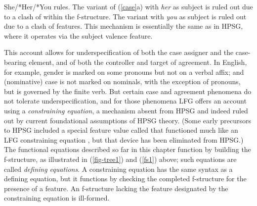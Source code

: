 \eal 
 \label{case}
\ex She/*Her/*You rules.
 \zl
The variant of (\ref{case}a) with \textit{her} as subject is ruled out due to a clash of   within the \subj{}  f-structure.  The variant with \textit{you} as subject is ruled out due to a clash of  features.  This mechanism is essentially the same as in HPSG, where it operates via the subject valence feature.  

This account allows for underspecification of both the case assigner and the case-bearing element, and of both the controller and target of agreement.   In  English, for example, gender is marked on some pronouns but not on a verbal affix; and (nominative) case is not marked on   nominals, with the exception of  pronouns, but is governed by the finite verb.  But certain case and agreement phenomena do not tolerate underspecification, and for those phenomena LFG offers an account using a \textit{constraining equation}, a mechanism absent from HPSG and indeed ruled out by current foundational assumptions of HPSG theory.  (Some early precursors to HPSG included a special feature value called  that functioned much like an LFG constraining equation \citep[36-37]{Shieber86a}, but that device has been eliminated from HPSG.)  The functional equations described so far in this chapter function by building the f-structure, as illustrated in (\ref{fig-tree1}) and (\ref{fs1}) above; such equations are called \textit{defining equations}.  A constraining equation has the same syntax as a defining equation, but it functions by checking the completed f-structure for the presence of a feature.  An f-structure lacking the feature designated by the constraining equation is ill-formed.  

